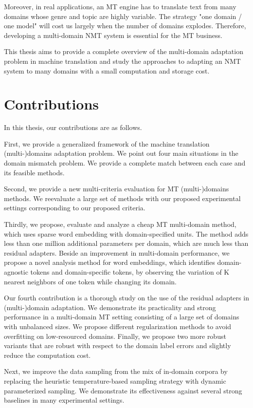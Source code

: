 Moreover, in real applications, an MT engine has to translate text from many domains whose genre and topic are highly variable. The strategy "one domain / one model" will cost us largely when the number of domains explodes. Therefore, developing a multi-domain NMT system is essential for the MT business.

This thesis aims to provide a complete overview of the multi-domain adaptation problem in machine translation and study the approaches to adapting an NMT system to many domains with a small computation and storage cost.

\section{Contributions}
In this thesis, our contributions are as follows.

First, we provide a generalized framework of the machine translation (multi-)domains adaptation problem. We point out four main situations in the domain mismatch problem. We provide a complete match between each case and its feasible methods.

Second, we provide a new multi-criteria evaluation for MT (multi-)domains methods. We reevaluate a large set of methods with our proposed experimental settings corresponding to our proposed criteria.

Thirdly, we propose, evaluate and analyze a cheap MT multi-domain method, which uses sparse word embedding with domain-specified units. The method adds less than one million additional parameters per domain, which are much less than residual adapters. Beside an improvement in multi-domain performance, we propose a novel analysis method for word embeddings, which identifies domain-agnostic tokens and domain-specific tokens, by observing the variation of K nearest neighbors of one token while changing its domain.

Our fourth contribution is a thorough study on the use of the residual adapters in (multi-)domain adaptation. We demonstrate its practicality and strong performance in a multi-domain MT setting consisting of a large set of domains with unbalanced sizes. We propose different regularization methods to avoid overfitting on low-resourced domains. Finally, we propose two more robust variants that are robust with respect to the domain label errors and slightly reduce the computation cost.

Next, we improve the data sampling from the mix of in-domain corpora by replacing the heuristic temperature-based sampling strategy with dynamic parameterized sampling. We demonstrate its effectiveness against several strong baselines in many experimental settings.

